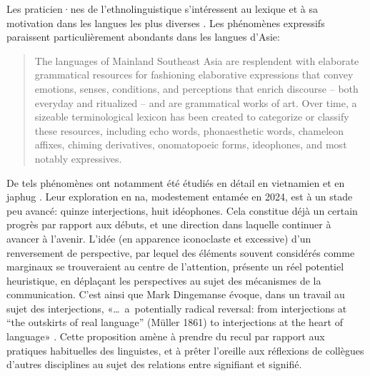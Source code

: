Les praticien·nes de l'ethnolinguistique s'intéressent au lexique et à sa motivation dans les langues les plus diverses \parencite{deColombel2002lexique}. Les phénomènes expressifs paraissent particulièrement abondants dans les langues d'Asie:

\begin{quotation}
    The languages of Mainland Southeast Asia are resplendent with elaborate grammatical resources for fashioning elaborative expressions that convey emotions, senses, conditions, and perceptions that enrich discourse -- both everyday and ritualized -- and are grammatical works of art. Over time, a sizeable terminological lexicon has been created to categorize or classify these resources, including echo words, phonaesthetic words, chameleon affixes, chiming derivatives, onomatopoeic forms, ideophones, and most notably expressives. \parencite[1]{williams_aesthetics_2014}
\end{quotation}

De tels phénomènes ont notamment été étudiés en détail en vietnamien \parencite{brunelleetal2014} et en japhug \parencite{jacques2013c}. Leur exploration en na, modestement entamée en 2024, est à un stade peu avancé: quinze interjections, huit idéophones. Cela constitue déjà un certain progrès par rapport aux débuts, et une direction dans laquelle continuer à avancer à l'avenir. L'idée (en apparence iconoclaste et excessive) d'un renversement de perspective, par lequel des éléments souvent considérés comme marginaux se trouveraient au centre de l'attention, présente un réel potentiel heuristique, en déplaçant les perspectives au sujet des mécanismes de la communication. C'est ainsi que Mark Dingemanse évoque, dans un travail au sujet des interjections, «{\dots}~a~potentially
radical reversal: from interjections at “the outskirts of real language” (Müller 1861) to interjections at the heart of language» \parencite[258]{dingemanse_interjections_2024}. Cette proposition amène à prendre du recul par rapport aux pratiques habituelles des linguistes, et à prêter l'oreille aux réflexions de collègues d'autres disciplines au sujet des relations entre signifiant et signifié.


